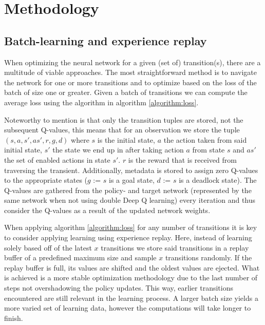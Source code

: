 \newpage
\section{Methodology}

\subsection{Batch-learning and experience replay}

When optimizing the neural network for a given (set of) transition(s), there are a multitude of viable approaches. The most straightforward method is to navigate the network for one or more transitions and to optimize based on the loss of the batch of size one or greater. Given a batch of transitions we can compute the average loss using the algorithm in algorithm \ref{algorithm:loss}.

Noteworthy to mention is that only the transition tuples are stored, not the subsequent Q-values, this means that for an observation we store the tuple $(s, a, s', as', r, g, d)$ where $s$ is the initial state, $a$ the action taken from said initial state, $s'$ the state we end up in after taking action $a$ from state $s$ and $as'$ the set of enabled actions in state $s'$. $r$ is the reward that is received from traversing the transient. Additionally, metadata is stored to assign zero Q-values to the appropriate states ($g$ := $s$ is a goal state, $d$ := $s$ is a deadlock state). The Q-values are gathered from the policy- and target network (represented by the same network when not using double Deep Q learning) every iteration and thus consider the Q-values as a result of the updated network weights.

When applying algorithm \ref{algorithm:loss} for any number of transitions it is key to consider applying learning using experience replay. Here, instead of learning solely based off of the latest $x$ transitions we store said transitions in a replay buffer of a predefined maximum size and sample $x$ transitions randomly. If the replay buffer is full, its values are shifted and the oldest values are ejected. What is achieved is a more stable optimization methodology due to the last number of steps not overshadowing the policy updates. This way, earlier transitions encountered are still relevant in the learning process. A larger batch size yields a more varied set of learning data, however the computations will take longer to finish.

